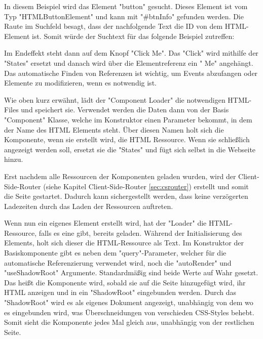 
In diesem Beispiel wird das Element "button" gesucht. Dieses Element ist vom Typ "HTMLButtonElement" und kann mit "{\ttfamily \#btnInfo}" gefunden werden. Die Raute im Suchfeld besagt, dass der nachfolgende Text die ID von dem HTML-Element ist. Somit würde der Suchtext für das folgende Beispiel zutreffen:


Im Endeffekt steht dann auf dem Knopf "Click Me". Das "Click" wird mithilfe der
"States" ersetzt und danach wird über die Elementreferenz ein " Me" angehängt. Das automatische Finden von Referenzen ist wichtig, um Events abzufangen oder Elemente zu modifizieren, wenn es notwendig ist.

Wie oben kurz erwähnt, lädt der "Component Loader" die notwendigen HTML-Files und speichert sie. Verwendet werden die Daten dann von der Basis "Component" Klasse, welche im Konstruktor einen Parameter bekommt, in dem der Name des HTML Elements steht. Über diesen Namen holt sich die Komponente, wenn sie erstellt wird, die HTML Ressource. Wenn sie schließlich angezeigt werden soll, ersetzt sie die "States" und fügt sich selbst in die Webseite hinzu.


Erst nachdem alle Ressourcen der Komponenten geladen wurden, wird der Client-Side-Router (siehe Kapitel Client-Side-Router \ref{sec:csrouter}) erstellt und somit die Seite gestartet. Dadurch kann sichergestellt werden, dass keine verzögerten Ladezeiten durch das Laden der Ressourcen auftreten.


Wenn nun ein eigenes Element erstellt wird, hat der "Loader" die HTML-Ressource, falls es eine gibt, bereits geladen. Während der Initialisierung des Elements, holt sich dieser die HTML-Ressource als Text. Im Konstruktor der Basiskomponente gibt es neben dem "query"-Parameter, welcher für die automatische Referenzierung verwendet wird, noch die "autoRender" und "useShadowRoot" Argumente. Standardmäßig sind beide Werte auf Wahr gesetzt. Das heißt die Komponente wird, sobald sie auf die Seite hinzugefügt wird, ihr HTML anzeigen und in ein "ShadowRoot" eingebunden werden. Durch das "ShadowRoot" wird es als eigenes Dokument angezeigt, unabhängig von dem wo es eingebunden wird, was Überschneidungen von verschieden CSS-Styles behebt. Somit sieht die Komponente jedes Mal gleich aus, unabhängig von der restlichen Seite.

